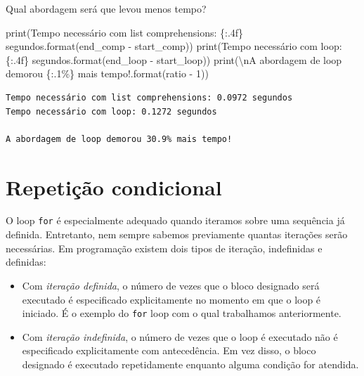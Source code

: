 \documentclass[
  brazilian,
  letterpaper,
  DIV=11,
  numbers=noendperiod]{scrreprt}
\newenvironment{Shaded}{\begin{snugshade}}{\end{snugshade}}
\newcommand{\BuiltInTok}[1]{\textcolor[rgb]{0.00,0.23,0.31}{#1}}
\newcommand{\CharTok}[1]{\textcolor[rgb]{0.13,0.47,0.30}{#1}}
\newcommand{\DecValTok}[1]{\textcolor[rgb]{0.68,0.00,0.00}{#1}}
\newcommand{\NormalTok}[1]{\textcolor[rgb]{0.00,0.23,0.31}{#1}}
\newcommand{\OperatorTok}[1]{\textcolor[rgb]{0.37,0.37,0.37}{#1}}
\newcommand{\SpecialCharTok}[1]{\textcolor[rgb]{0.37,0.37,0.37}{#1}}
\newcommand{\StringTok}[1]{\textcolor[rgb]{0.13,0.47,0.30}{#1}}
\begin{document}
Qual abordagem será que levou menos tempo?

\begin{Shaded}
\begin{Highlighting}[]
\BuiltInTok{print}\NormalTok{(}\StringTok{\textquotesingle{}Tempo necessário com list comprehensions: }\SpecialCharTok{\{:.4f\}}\StringTok{ segundos\textquotesingle{}}\NormalTok{.}\BuiltInTok{format}\NormalTok{(end\_comp }\OperatorTok{{-}}\NormalTok{ start\_comp))}
\BuiltInTok{print}\NormalTok{(}\StringTok{\textquotesingle{}Tempo necessário com loop: }\SpecialCharTok{\{:.4f\}}\StringTok{ segundos\textquotesingle{}}\NormalTok{.}\BuiltInTok{format}\NormalTok{(end\_loop }\OperatorTok{{-}}\NormalTok{ start\_loop))}
\BuiltInTok{print}\NormalTok{(}\StringTok{\textquotesingle{}}\CharTok{\textbackslash{}n}\StringTok{A abordagem de loop demorou }\SpecialCharTok{\{:.1\%\}}\StringTok{ mais tempo!\textquotesingle{}}\NormalTok{.}\BuiltInTok{format}\NormalTok{(ratio }\OperatorTok{{-}} \DecValTok{1}\NormalTok{))}
\end{Highlighting}
\end{Shaded}

\begin{verbatim}
Tempo necessário com list comprehensions: 0.0972 segundos
Tempo necessário com loop: 0.1272 segundos

A abordagem de loop demorou 30.9% mais tempo!
\end{verbatim}

\section{Repetição condicional}\label{repetiuxe7uxe3o-condicional}

O loop \texttt{for} é especialmente adequado quando iteramos sobre uma
sequência já definida. Entretanto, nem sempre sabemos previamente
quantas iterações serão necessárias. Em programação existem dois tipos
de iteração, indefinidas e definidas:

\begin{itemize}
\item
  Com \emph{iteração definida}, o número de vezes que o bloco designado
  será executado é especificado explicitamente no momento em que o loop
  é iniciado. É o exemplo do \texttt{for} loop com o qual trabalhamos
  anteriormente.
\item
  Com \emph{iteração indefinida}, o número de vezes que o loop é
  executado não é especificado explicitamente com antecedência. Em vez
  disso, o bloco designado é executado repetidamente enquanto alguma
  condição for atendida.
\end{itemize}
\end{document}
